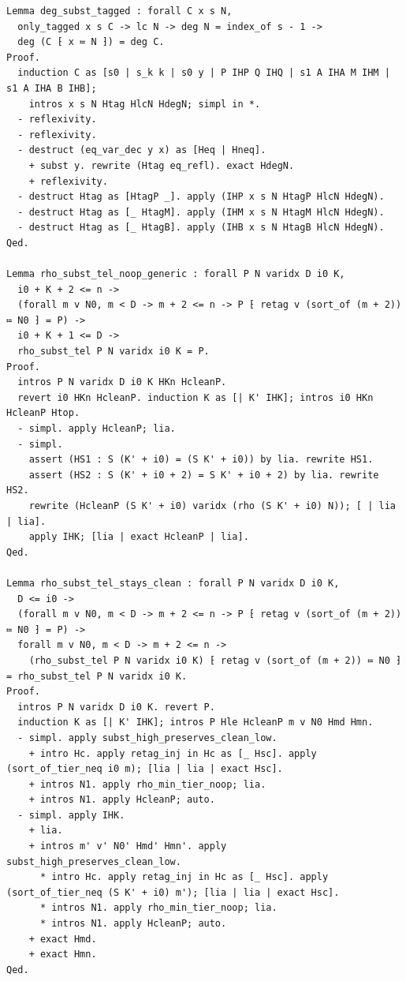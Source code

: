 \begin{latin}
\begin{verbatim}
Lemma deg_subst_tagged : forall C x s N,
  only_tagged x s C -> lc N -> deg N = index_of s - 1 ->
  deg (C ⁅ x ≔ N ⁆) = deg C.
Proof.
  induction C as [s0 | s_k k | s0 y | P IHP Q IHQ | s1 A IHA M IHM | s1 A IHA B IHB];
    intros x s N Htag HlcN HdegN; simpl in *.
  - reflexivity.
  - reflexivity.
  - destruct (eq_var_dec y x) as [Heq | Hneq].
    + subst y. rewrite (Htag eq_refl). exact HdegN.
    + reflexivity.
  - destruct Htag as [HtagP _]. apply (IHP x s N HtagP HlcN HdegN).
  - destruct Htag as [_ HtagM]. apply (IHM x s N HtagM HlcN HdegN).
  - destruct Htag as [_ HtagB]. apply (IHB x s N HtagB HlcN HdegN).
Qed.

Lemma rho_subst_tel_noop_generic : forall P N varidx D i0 K,
  i0 + K + 2 <= n ->
  (forall m v N0, m < D -> m + 2 <= n -> P ⁅ retag v (sort_of (m + 2)) ≔ N0 ⁆ = P) ->
  i0 + K + 1 <= D ->
  rho_subst_tel P N varidx i0 K = P.
Proof.
  intros P N varidx D i0 K HKn HcleanP.
  revert i0 HKn HcleanP. induction K as [| K' IHK]; intros i0 HKn HcleanP Htop.
  - simpl. apply HcleanP; lia.
  - simpl.
    assert (HS1 : S (K' + i0) = (S K' + i0)) by lia. rewrite HS1.
    assert (HS2 : S (K' + i0 + 2) = S K' + i0 + 2) by lia. rewrite HS2.
    rewrite (HcleanP (S K' + i0) varidx (rho (S K' + i0) N)); [ | lia | lia].
    apply IHK; [lia | exact HcleanP | lia].
Qed.

Lemma rho_subst_tel_stays_clean : forall P N varidx D i0 K,
  D <= i0 ->
  (forall m v N0, m < D -> m + 2 <= n -> P ⁅ retag v (sort_of (m + 2)) ≔ N0 ⁆ = P) ->
  forall m v N0, m < D -> m + 2 <= n ->
    (rho_subst_tel P N varidx i0 K) ⁅ retag v (sort_of (m + 2)) ≔ N0 ⁆ = rho_subst_tel P N varidx i0 K.
Proof.
  intros P N varidx D i0 K. revert P.
  induction K as [| K' IHK]; intros P Hle HcleanP m v N0 Hmd Hmn.
  - simpl. apply subst_high_preserves_clean_low.
    + intro Hc. apply retag_inj in Hc as [_ Hsc]. apply (sort_of_tier_neq i0 m); [lia | lia | exact Hsc].
    + intros N1. apply rho_min_tier_noop; lia.
    + intros N1. apply HcleanP; auto.
  - simpl. apply IHK.
    + lia.
    + intros m' v' N0' Hmd' Hmn'. apply subst_high_preserves_clean_low.
      * intro Hc. apply retag_inj in Hc as [_ Hsc]. apply (sort_of_tier_neq (S K' + i0) m'); [lia | lia | exact Hsc].
      * intros N1. apply rho_min_tier_noop; lia.
      * intros N1. apply HcleanP; auto.
    + exact Hmd.
    + exact Hmn.
Qed.


\end{verbatim}
\end{latin}
